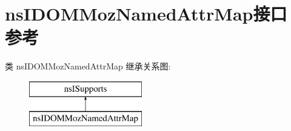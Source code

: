 \hypertarget{interfacens_i_d_o_m_moz_named_attr_map}{}\section{ns\+I\+D\+O\+M\+Moz\+Named\+Attr\+Map接口 参考}
\label{interfacens_i_d_o_m_moz_named_attr_map}
类 ns\+I\+D\+O\+M\+Moz\+Named\+Attr\+Map 继承关系图\+:\begin{figure}[H]
\begin{center}
\leavevmode
\includegraphics[height=2.000000cm]{interfacens_i_d_o_m_moz_named_attr_map}
\end{center}
\end{figure}
